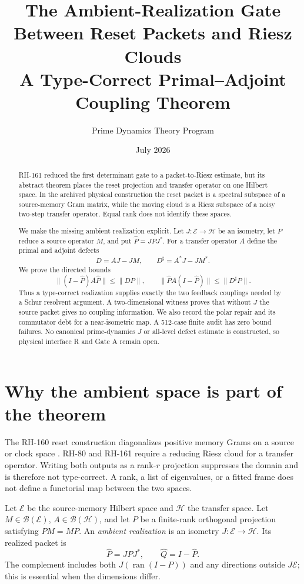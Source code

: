 \documentclass[12pt]{article}
\title{The Ambient-Realization Gate Between Reset Packets and Riesz Clouds\\\large A Type-Correct Primal--Adjoint Coupling Theorem}
\author{Prime Dynamics Theory Program}
\date{July 2026}
\newcommand{\cE}{\mathcal E}
\newcommand{\cH}{\mathcal H}
\newcommand{\norm}[1]{\lVert#1\rVert}
\begin{document}
\maketitle

\begin{abstract}
RH-161 reduced the first determinant gate to a packet-to-Riesz estimate, but
its abstract theorem places the reset projection and transfer operator on one
Hilbert space.  In the archived physical construction the reset packet is a
spectral subspace of a source-memory Gram matrix, while the moving cloud is a
Riesz subspace of a noisy two-step transfer operator.  Equal rank does not
identify these spaces.

We make the missing ambient realization explicit.  Let
$J:\cE\to\cH$ be an isometry, let $P$ reduce a source operator $M$, and put
$\widehat P=JPJ^*$.  For a transfer operator $A$ define the primal and
adjoint defects
\[
 D=AJ-JM,\qquad D^\sharp=A^*J-JM^*.
\]
We prove the directed bounds
\[
 \norm{(I-\widehat P)A\widehat P}\leq\norm{DP},\qquad
 \norm{\widehat PA(I-\widehat P)}\leq\norm{D^\sharp P}.
\]
Thus a type-correct realization supplies exactly the two feedback couplings
needed by a Schur resolvent argument.  A two-dimensional witness proves that
without $J$ the source packet gives no coupling information.  We also record
the polar repair and its commutator debt for a near-isometric map.  A 512-case
finite audit has zero bound failures.  No canonical prime-dynamics $J$ or
all-level defect estimate is constructed, so physical interface R and Gate A
remain open.
\end{abstract}

\section{Why the ambient space is part of the theorem}
The RH-160 reset construction diagonalizes positive memory Grams on a source
or clock space \citep{WangRH160}.  RH-80 and RH-161 require a reducing Riesz
cloud for a transfer operator.  Writing both outputs as a rank-$r$ projection
suppresses the domain and is therefore not type-correct.  A rank, a list of
eigenvalues, or a fitted frame does not define a functorial map between the
two spaces.

Let $\cE$ be the source-memory Hilbert space and $\cH$ the transfer space.
Let $M\in\mathcal B(\cE)$, $A\in\mathcal B(\cH)$, and let $P$ be a finite-rank
orthogonal projection satisfying $PM=MP$.  An \emph{ambient realization} is
an isometry $J:\cE\to\cH$.  Its realized packet is
\[
 \widehat P=JPJ^*,\qquad \widehat Q=I-\widehat P.
\]
The complement includes both $J(\operatorname{ran}(I-P))$ and any directions
outside $J\cE$; this is essential when the dimensions differ.
\end{document}
